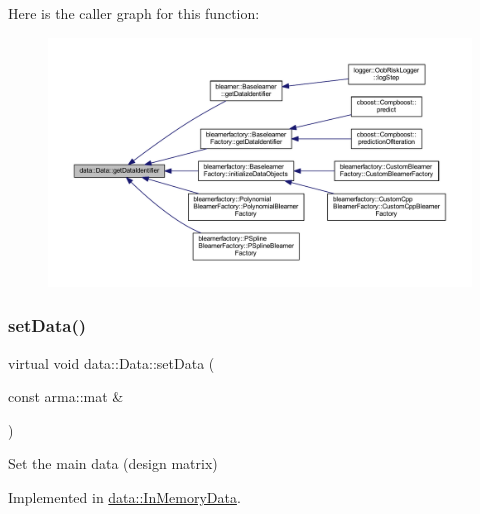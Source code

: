 Here is the caller graph for this function\+:\nopagebreak
\begin{figure}[H]
\begin{center}
\leavevmode
\includegraphics[width=350pt]{classdata_1_1_data_a1af63a4e5aa708de31e1ffdd727a4e16_icgraph}
\end{center}
\end{figure}
\mbox{\label{classdata_1_1_data_a0e928c49b31f803e7984cc24e2f73f70}} 
\subsubsection{\texorpdfstring{set\+Data()}{setData()}}
{\footnotesize\ttfamily virtual void data\+::\+Data\+::set\+Data (\begin{DoxyParamCaption}\item[{const arma\+::mat \&}]{ }\end{DoxyParamCaption})\hspace{0.3cm}{\ttfamily [pure virtual]}}



Set the main data (design matrix) 



Implemented in \mbox{\hyperlink{classdata_1_1_in_memory_data_a0456d66f7930809211c75bcdd80a7bca}{data\+::\+In\+Memory\+Data}}.

